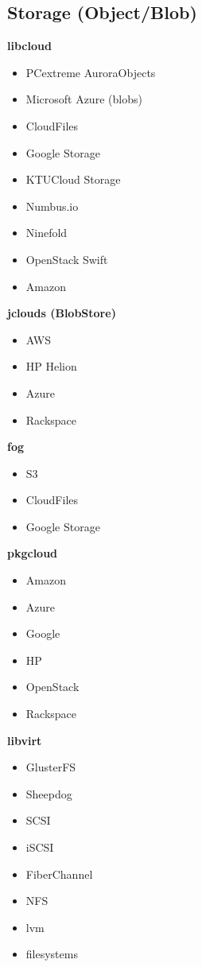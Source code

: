 \documentclass[11pt]{scrartcl}
\begin{document}
\subsection{Storage (Object/Blob)}
\textbf{libcloud}
\begin{itemize}
\item PCextreme AuroraObjects
\item Microsoft Azure (blobs)
\item CloudFiles
\item Google Storage
\item KTUCloud Storage
\item Numbus.io
\item Ninefold
\item OpenStack Swift
\item Amazon
\end{itemize}

\textbf{jclouds (BlobStore)}
\begin{itemize}
\item AWS
\item HP Helion
\item Azure
\item Rackspace
\end{itemize}

\textbf{fog}
\begin{itemize}
\item S3
\item CloudFiles
\item Google Storage
\end{itemize}

\textbf{pkgcloud}
\begin{itemize}
\item Amazon
\item Azure
\item Google
\item HP
\item OpenStack
\item Rackspace
\end{itemize}

\textbf{libvirt}
\begin{itemize}
  \item GlusterFS
  \item Sheepdog
  \item SCSI
  \item iSCSI
  \item FiberChannel
  \item NFS
  \item lvm
  \item filesystems
\end{itemize}
\end{document}
